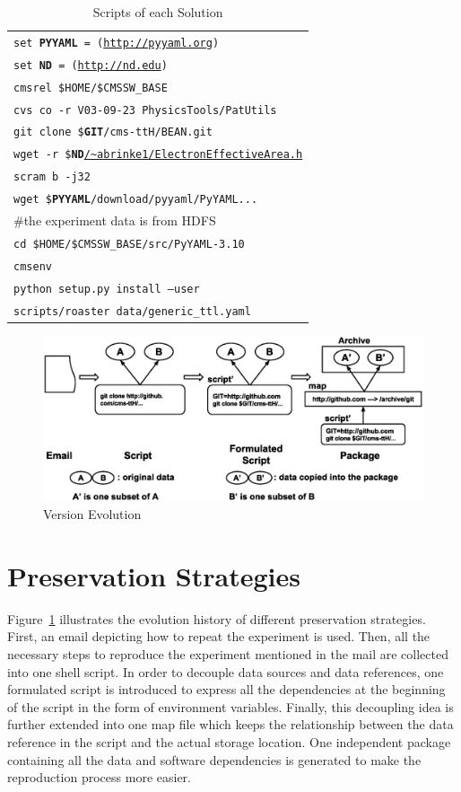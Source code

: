 \documentclass{acm_proc_article-sp}
\begin{document}
\begin{table}
\begin{tabular}{|l|}
        {\tt set {\bf PYYAML} = (\url{http://pyyaml.org})} \\
        {\tt set {\bf ND} = (\url{http://nd.edu})} \\
        {\tt cmsrel \$HOME/\$CMSSW\_BASE} \\
        {\tt cvs co -r V03-09-23 PhysicsTools/PatUtils} \\
        {\tt git clone \${\bf GIT}/cms-ttH/BEAN.git} \\
        {\tt wget -r \${\bf ND}\url{/~abrinke1/ElectronEffectiveArea.h}} \\
        {\tt scram b -j32} \\
        {\tt wget \${\bf PYYAML}/download/pyyaml/PyYAML...}\\
        \#the experiment data is from HDFS \\
        {\tt cd \$HOME/\$CMSSW\_BASE/src/PyYAML-3.10}\\
        {\tt cmsenv}\\
        {\tt python setup.py install --user} \\
        {\tt scripts/roaster data/generic\_ttl.yaml} \\ 
        \hline
    \end{tabular}
    \caption{Scripts of each Solution}
    \label{table:scripts}
\end{table}

\begin{figure}
\centering
\includegraphics[width=1.6\columnwidth]{version-evolution.eps}
\caption{Version Evolution}
\label{fig:version-evolution}
\end{figure}

\section{Preservation Strategies}

Figure~\ref{fig:version-evolution} illustrates the evolution history of
different preservation strategies. First, an email depicting how to repeat the
experiment is used. Then, all the necessary steps to reproduce the experiment
mentioned in the mail are collected into one shell script. In order to decouple
data sources and data references, one formulated script is introduced
to express all the dependencies at the beginning of the script in the form of
environment variables. Finally, this decoupling idea is further extended into
one map file which keeps the relationship between the data reference in the
script and the actual storage location. One independent package containing all
the data and software dependencies is generated to make the reproduction
process more easier.  
\end{document}
